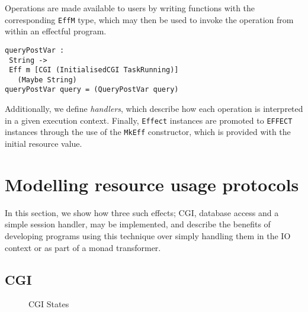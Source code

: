 \documentclass[preprint]{sigplanconf}
\begin{document}
Operations are made available to users by writing functions with the
corresponding \texttt{EffM} type, which may then be used to invoke the
operation from within an effectful program.

\begin{Verbatim}
queryPostVar : 
 String -> 
 Eff m [CGI (InitialisedCGI TaskRunning)] 
   (Maybe String)
queryPostVar query = (QueryPostVar query)
\end{Verbatim}

Additionally, we define \textit{handlers}, which describe how each operation is
interpreted in a given execution context. Finally, \texttt{Effect} instances
are promoted to \texttt{EFFECT} instances through the use of the \texttt{MkEff}
constructor, which is provided with the initial resource value.


\section{Modelling resource usage protocols}
\label{rup}
In this section, we show how three such effects; CGI, database access and a simple session handler, may be implemented, and describe the benefits of developing programs using this technique over simply handling them in the IO context or as part of a monad transformer.


\subsection{CGI}
\begin{figure}[htpb!]
\centering
{}
\caption{CGI States}
\label{fig:cgistates}
\end{figure}
\end{document}
